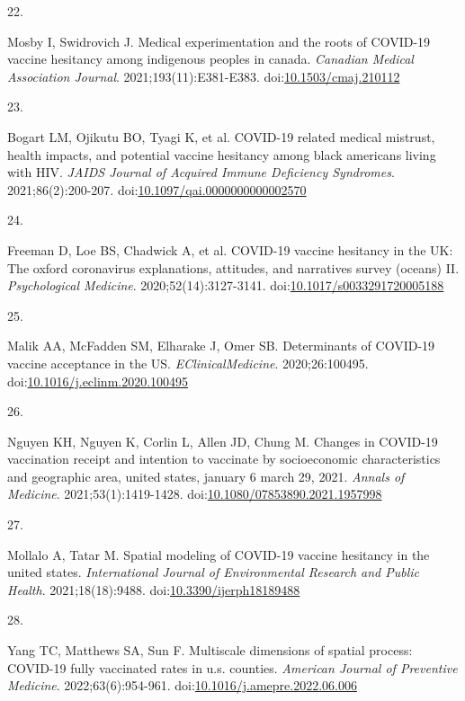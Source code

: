 \documentclass[
]{article}
\newlength{\cslhangindent}
\newlength{\csllabelwidth}
\newlength{\cslentryspacingunit} %
\newenvironment{CSLReferences}[2] %
 {%
  \setlength{\parindent}{0pt}
  \ifodd #1
  \let\oldpar\par
  \def\par{\hangindent=\cslhangindent\oldpar}
  \fi
  \setlength{\parskip}{#2\cslentryspacingunit}
 }%
 {}
\newcommand{\CSLLeftMargin}[1]{\parbox[t]{\csllabelwidth}{#1}}
\newcommand{\CSLRightInline}[1]{\parbox[t]{\linewidth - \csllabelwidth}{#1}\break}
\begin{document}
\begin{CSLReferences}{0}{0}
\leavevmode{}%
\CSLLeftMargin{22. }%
\CSLRightInline{Mosby I, Swidrovich J. Medical experimentation and the
roots of {COVID}-19 vaccine hesitancy among indigenous peoples in
canada. \emph{Canadian Medical Association Journal}.
2021;193(11):E381-E383.
doi:\href{https://doi.org/10.1503/cmaj.210112}{10.1503/cmaj.210112}}

\leavevmode{}%
\CSLLeftMargin{23. }%
\CSLRightInline{Bogart LM, Ojikutu BO, Tyagi K, et al. {COVID}-19
related medical mistrust, health impacts, and potential vaccine
hesitancy among black americans living with {HIV}. \emph{{JAIDS} Journal
of Acquired Immune Deficiency Syndromes}. 2021;86(2):200-207.
doi:\href{https://doi.org/10.1097/qai.0000000000002570}{10.1097/qai.0000000000002570}}

\leavevmode{}%
\CSLLeftMargin{24. }%
\CSLRightInline{Freeman D, Loe BS, Chadwick A, et al. {COVID}-19 vaccine
hesitancy in the {UK}: The oxford coronavirus explanations, attitudes,
and narratives survey (oceans) {II}. \emph{Psychological Medicine}.
2020;52(14):3127-3141.
doi:\href{https://doi.org/10.1017/s0033291720005188}{10.1017/s0033291720005188}}

\leavevmode{}%
\CSLLeftMargin{25. }%
\CSLRightInline{Malik AA, McFadden SM, Elharake J, Omer SB. Determinants
of {COVID}-19 vaccine acceptance in the {US}.
\emph{{EClinicalMedicine}}. 2020;26:100495.
doi:\href{https://doi.org/10.1016/j.eclinm.2020.100495}{10.1016/j.eclinm.2020.100495}}

\leavevmode{}%
\CSLLeftMargin{26. }%
\CSLRightInline{Nguyen KH, Nguyen K, Corlin L, Allen JD, Chung M.
Changes in {COVID}-19 vaccination receipt and intention to vaccinate by
socioeconomic characteristics and geographic area, united states,
january 6 {\textendash} march 29, 2021. \emph{Annals of Medicine}.
2021;53(1):1419-1428.
doi:\href{https://doi.org/10.1080/07853890.2021.1957998}{10.1080/07853890.2021.1957998}}

\leavevmode{}%
\CSLLeftMargin{27. }%
\CSLRightInline{Mollalo A, Tatar M. Spatial modeling of {COVID}-19
vaccine hesitancy in the united states. \emph{International Journal of
Environmental Research and Public Health}. 2021;18(18):9488.
doi:\href{https://doi.org/10.3390/ijerph18189488}{10.3390/ijerph18189488}}

\leavevmode{}%
\CSLLeftMargin{28. }%
\CSLRightInline{Yang TC, Matthews SA, Sun F. Multiscale dimensions of
spatial process: {COVID}-19 fully vaccinated rates in u.s. counties.
\emph{American Journal of Preventive Medicine}. 2022;63(6):954-961.
doi:\href{https://doi.org/10.1016/j.amepre.2022.06.006}{10.1016/j.amepre.2022.06.006}}


\end{CSLReferences}
\end{document}
